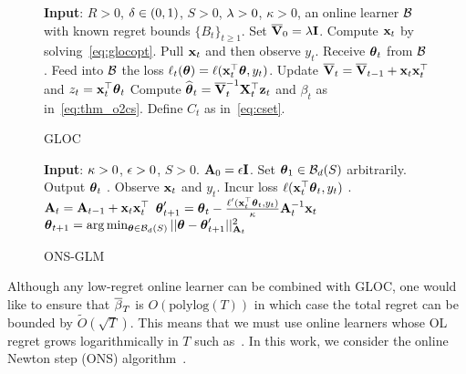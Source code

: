 \begin{wrapfigure}{R}{0.48\textwidth}
  \vspace{-22pt}
\begin{minipage}{0.48\textwidth}
\begin{algorithm}[H]
{\small
  \begin{algorithmic}[1]
    \STATE \textbf{Input}: $R>0$, ${\delta}\in(0,1)$, $S>0$, ${\lambda}>0$, $\kappa>0$, an online learner $\mathcal{B}$ with known regret bounds $\{B_t\}_{t\ge1}$. 
    \STATE Set $\overline{\mathbf{V}}_0 = {\lambda} \mathbf{I}$.
    \STATE Compute $\mathbf{x}_t$ by solving~\eqref{eq:glocopt}.
      \STATE Pull $\mathbf{x}_t$ and then observe $y_t$.
      \STATE Receive ${{\boldsymbol \theta}}_t$ from $\mathcal{B}$.
      \STATE Feed into $\mathcal{B}$ the loss $\ell_t({{\boldsymbol \theta}}) = \ell(\mathbf{x}_t^{\top} {{\boldsymbol \theta}}, y_t)$.
      \STATE Update $\overline{\mathbf{V}}_t = \overline{\mathbf{V}}_{t-1} + \mathbf{x}_t\mathbf{x}_t^{\top}$ and $z_t = \mathbf{x}_t^{\top}{{\boldsymbol \theta}}_t$
      \STATE Compute ${{\widehat{\boldsymbol \theta}}}_t = \overline{\mathbf{V}}^{-1}_t \mathbf{X}_t^{\top}{{\mathbf z}}_t$  and $\beta_t$ as in~\eqref{eq:thm_o2cs}.
      \STATE Define $C_t$ as in~\eqref{eq:cset}.
    \ENDFOR
  \end{algorithmic}
  \caption{GLOC}
  \label{alg:gloc}
}
\end{algorithm}
\vspace{-20pt}
\begin{algorithm}[H]
{\small
  \begin{algorithmic}[1]
    \STATE \textbf{Input}: ${\kappa}>0$, $\epsilon>0$, $S >0$.%
    \STATE $\mathbf{A}_0 = \epsilon\mathbf{I}$.
    \STATE Set ${{\boldsymbol \theta}}_1 \in \mathcal{B}_d(S)$ arbitrarily.
      \STATE Output ${{\boldsymbol \theta}}_t$ .
      \STATE Observe $\mathbf{x}_t$ and $y_t$. 
      \STATE Incur loss $\ell(\mathbf{x}_t^{\top}{{\boldsymbol \theta}}_t, y_t)$ .
      \STATE $\mathbf{A}_t = \mathbf{A}_{t-1} + \mathbf{x}_t \mathbf{x}_t^{\top}$
      \STATE ${{\boldsymbol \theta}}'_{t+1} = {{\boldsymbol \theta}}_{t} - { \frac{\ell'(\mathbf{x}_{t}^{\top}{{\boldsymbol \theta}}_{t}, y_t)}{{\kappa}} } \mathbf{A}^{-1}_{t} \mathbf{x}_{t} $
      \STATE ${{\boldsymbol \theta}}_{t+1} = \arg \min_{{{\boldsymbol \theta}}\in\mathcal{B}_d(S)} || {{\boldsymbol \theta}} - {{\boldsymbol \theta}}'_{t+1} ||^2_{\mathbf{A}_{t}}  $   
    \ENDFOR
  \end{algorithmic}
  \caption{ONS-GLM}
  \label{alg:ons}
}
\end{algorithm}
\end{minipage}
\vspace{-15pt}
\end{wrapfigure}
%
Although any low-regret online learner can be combined with GLOC, one would like to ensure that ${\overline{\beta}}_T$ is $O(\text{polylog}(T))$ in which case the total regret can be bounded by $\tilde O(\sqrt{T})$.
This means that we must use online learners whose OL regret grows logarithmically in $T$ such as~\cite{hazan07logarithmic,orabona12beyond}.
In this work, we consider the online Newton step (ONS) algorithm~\cite{hazan07logarithmic}.


